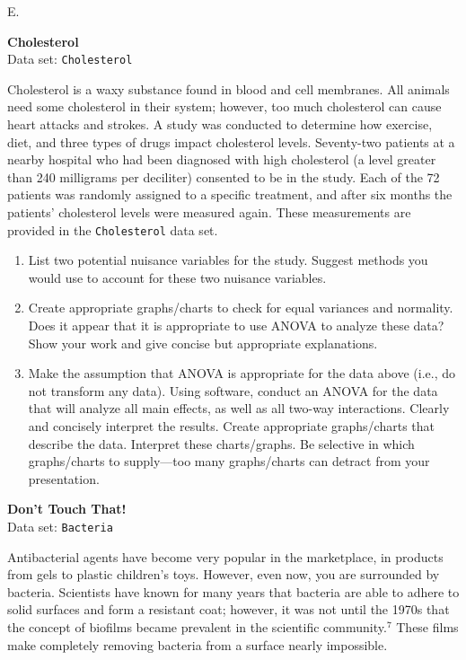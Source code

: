 \documentclass[
]{report}
\newcounter{excount}
\renewcommand{\theexcount}{E\arabic{excount}}
\begin{document}
\begin{list}{\theexcount.}{ \setlength{\itemsep}{1.2em}}
  \item \textbf{Cholesterol}\\
  Data set: \texttt{Cholesterol}

Cholesterol is a waxy substance found in blood and cell membranes. All animals need some cholesterol in their system; however, too much cholesterol can cause heart attacks and strokes. A study was conducted to determine how exercise, diet, and three types of drugs impact cholesterol levels. Seventy-two patients at a nearby hospital who had been diagnosed with high cholesterol (a level greater than 240 milligrams per deciliter) consented to be in the study. Each of the 72 patients was randomly assigned to a specific treatment, and after six months the patients’ cholesterol levels were measured again. These measurements are provided in the \texttt{Cholesterol} data set.

  \begin{enumerate}
    \item List two potential nuisance variables for the study. Suggest methods you would use to account for these two nuisance variables.
    \item Create appropriate graphs/charts to check for equal variances and normality. Does it appear that it is appropriate to use ANOVA to analyze these data? Show your work and give concise but appropriate explanations.
    \item Make the assumption that ANOVA is appropriate for the data above (i.e., do not transform any data). Using software, conduct an ANOVA for the data that will analyze all main effects, as well as all two-way interactions. Clearly and concisely interpret the results. Create appropriate graphs/charts that describe the data. Interpret these charts/graphs. Be selective in which graphs/charts to supply---too many graphs/charts can detract from your presentation.
  \end{enumerate}

  \item \textbf{Don't Touch That!}\\
  Data set: \texttt{Bacteria}

Antibacterial agents have become very popular in the marketplace, in products from gels to plastic children’s toys. However, even now, you are surrounded by bacteria. Scientists have known for many years that bacteria are able to adhere to solid surfaces and form a resistant coat; however, it was not until the 1970s that the concept of biofilms became prevalent in the scientific community.$^7$ These films make completely removing bacteria from a surface nearly impossible.


\end{list}
\end{document}

